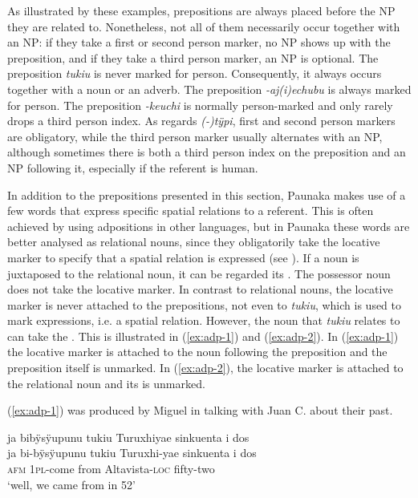 As illustrated by these examples, prepositions are always placed before the NP they are related to. Nonetheless, not all of them necessarily occur together with an NP: if they take a first or second person marker, no NP shows up with the preposition, and if they take a third person marker, an NP is optional. The  preposition \textit{tukiu} is never marked for person. Consequently, it always occurs together with a noun or an adverb. The  preposition \textit{-aj(i)echubu} is always marked for person. The  preposition \textit{-keuchi} is normally person-marked and only rarely drops a third person index. As regards \textit{(-)tÿpi}, first and second person markers are obligatory, while the third person marker usually alternates with an NP, although sometimes there is both a third person index on the preposition and an NP following it, especially if the referent is human.

In addition to the prepositions presented in this section, Paunaka makes use of a few words that express specific spatial relations to a referent. This is often achieved by using adpositions in other languages, but in Paunaka these words are better analysed as relational nouns, since they obligatorily take the locative marker to specify that a spatial relation is expressed (see ). If a noun is juxtaposed to the relational noun, it can be regarded its . The possessor noun does not take the locative marker. In contrast to relational nouns, the locative marker is never attached to the prepositions, not even to \textit{tukiu}, which is used to mark  expressions, i.e. a spatial relation. However, the noun that \textit{tukiu} relates to can take the . This is illustrated in (\ref{ex:adp-1}) and (\ref{ex:adp-2}). In (\ref{ex:adp-1}) the locative marker is attached to the noun following the preposition and the preposition itself is unmarked. In (\ref{ex:adp-2}), the locative marker is attached to the relational noun and its  is unmarked.

(\ref{ex:adp-1}) was produced by Miguel in talking with Juan C. about their past. 

\ea\label{ex:adp-1}
\begingl
\glpreamble ja bibÿsÿupunu tukiu Turuxhiyae sinkuenta i dos\\
\gla ja bi-bÿsÿupunu tukiu Turuxhi-yae {sinkuenta i dos}\\
\glb \textsc{afm} 1\textsc{pl}-come from Altavista-\textsc{loc} {fifty-two}\\
\glft ‘well, we came from  in 52’
\endgl
\trailingcitation{[mqx-p110826l.055]}
\xe

